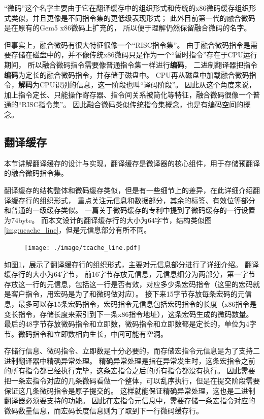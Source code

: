 “微码”这个名字主要由于它在翻译缓存中的组织形式和传统的x86微码缓存组织形式类似，并且更像是不同指令集的更低级表现形式；
此外目前第一代的融合微码是在原有的Gem5 x86微码上扩充的，
所以便于理解仍然保留融合微码的名字。

但事实上，融合微码有很大特征很像一个“RISC指令集”。
由于融合微码指令是需要存储在磁盘中的，并不像传统x86微码只是作为一个“暂时指令”存在于CPU运行期间，
所以融合微码指令需要像普通指令集一样进行\textbf{编码}，
二进制翻译器把指令\textbf{编码}为定长的融合微码指令，并存储于磁盘中。
CPU再从磁盘中加载融合微码指令，\textbf{解码}为CPU识别的信息，这一阶段也叫“译码阶段”。
因此从这个角度来说，加上指令定长、只能操作寄存器、指令间关系被简化等特征，融合微码很像一个普通的“RISC指令集”。
因此融合微码类似传统指令集概念，也是有编码空间的概念。

\subsection{翻译缓存}\label{sec:tcache}

本节讲解翻译缓存的设计与实现，翻译缓存是微译器的核心组件，用于存储预翻译的融合微码指令集。

翻译缓存的结构整体和微码缓存类似，但是有一些细节上的差异，在此详细介绍翻译缓存行的组织形式，
重点关注元信息和数据部分，其余的标签、有效位等部分和普通的一级缓存类似。
一篇关于微码缓存的专利\cite{uopPatent}中提到了微码缓存的一行设置为74byte。
而本文设计的翻译缓存行的大小为64字节，结构类似图\ref{img:ucache_line}，但是元信息部分有所不同。

\begin{figure}[!htbp]
  \centering
  \texttt{[image: ./image/tcache\_line.pdf]}
  \label{img:tcache_line}
\end{figure}

如图\ref{img:tcache_line}，展示了翻译缓存行的组织形式，主要对元信息部分进行了详细介绍。
翻译缓存行的大小为64字节，
前16字节存放元信息，元信息细分为两部分，第一字节存放这一行的元信息，包括这一行是否有效，对应多少条宏码指令（这里的宏码就是客户指令，用宏码是为了和微码做对应）。
接下来15字节存放每条宏码的元信息，最多可以存15条宏码指令，宏码指令元信息包括宏码指令的长度（x86指令是变长指令，存储长度来索引到下一条x86指令地址），这条宏码生成的微码数量。
最后的48字节存放微码指令和立即数，微码指令和立即数都是定长的，单位为4字节。微码指令和立即数相向生长，中间可能有空洞。

存储行信息、微码指令、立即数是十分必要的，而存储宏指令元信息是为了支持二进制翻译器中精确异常处理。
精确异常处理是指在异常发生时，这条宏指令之前的所有指令都已经执行完毕，这条宏指令之后的所有指令都没有执行。
因此需要把一条宏指令对应的几条微码看做一个整体，可以乱序执行，但是在提交阶段需要保证这几条微码指令是原子提交的。
这样就能保证精确异常处理，这也是二进制翻译器必须要支持的功能。
因此在宏指令元信息中，需要存储一条宏指令对应的微码数量信息，而宏码长度信息则为了取到下一行微码缓存行。



